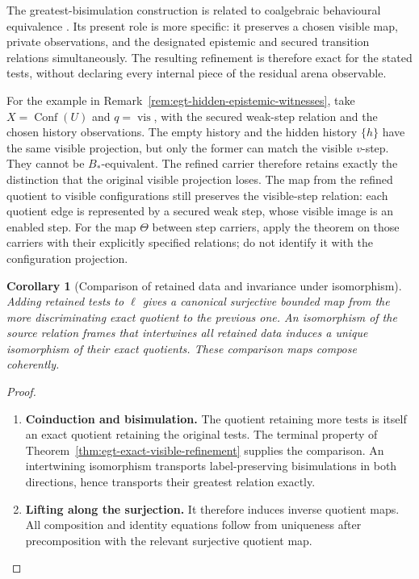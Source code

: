 \documentclass[11pt,a4paper]{article}
\numberwithin{equation}{section}
\newtheorem{corollary}[theorem]{Corollary}
\theoremstyle{definition}
\theoremstyle{remark}
\theoremstyle{plain}
\begin{document}
The greatest-bisimulation construction is related to coalgebraic
behavioural equivalence \citep{Rutten2000UniversalCoalgebra}.
Its present role is more specific: it preserves a chosen visible map,
private observations, and the designated epistemic and secured
transition relations simultaneously. The resulting refinement is
therefore exact for the stated tests, without declaring every internal
piece of the residual arena observable.

For the example in Remark~\ref{rem:egt-hidden-epistemic-witnesses}, take
$X=\operatorname{Conf}(U)$ and $q=\operatorname{vis}$, with the
secured weak-step relation and the chosen history observations. The empty
history and the hidden history $\{h\}$ have the same visible projection,
but only the former can match the visible $v$-step. They cannot be
$B_*$-equivalent. The refined carrier therefore retains exactly the
distinction that the original visible projection loses. The map from the
refined quotient to visible configurations still preserves the visible-step
relation: each quotient edge is represented by a secured weak step, whose
visible image is an enabled step. For the map
$\Theta$ between step carriers, apply the theorem on those carriers with
their explicitly specified relations; do not identify it with the
configuration projection.

\begin{corollary}[Comparison of retained data and invariance under isomorphism]
\label{cor:egt-exact-refinement-comparison}
Adding retained tests to $\ell$ gives a canonical surjective bounded
map from the more discriminating exact quotient to the previous one.
An isomorphism of the source relation frames that intertwines all retained
data induces a unique isomorphism of their exact quotients. These comparison
maps compose coherently.
\end{corollary}
\begin{proof}
\leavevmode
\begin{enumerate}[label=\textup{(\arabic*)},leftmargin=*,itemsep=4pt,topsep=3pt]
  \item \textbf{Coinduction and bisimulation.} The quotient retaining more tests is itself an exact quotient retaining
the original tests. The terminal property of
Theorem~\ref{thm:egt-exact-visible-refinement} supplies the comparison. An intertwining isomorphism transports label-preserving bisimulations in
both directions, hence transports their greatest relation exactly.
  \item \textbf{Lifting along the surjection.} It therefore induces inverse quotient maps. All composition and identity
equations follow from uniqueness after precomposition with the relevant
surjective quotient map.
\end{enumerate}
\end{proof}
\end{document}
